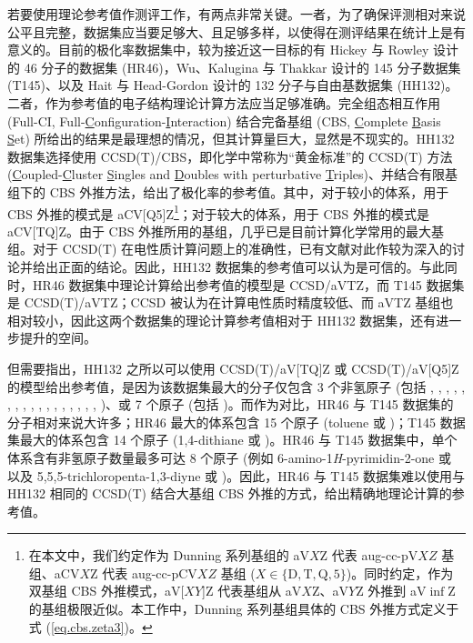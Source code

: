 若要使用理论参考值作测评工作，有两点非常关键。一者，为了确保评测相对来说公平且完整，数据集应当要足够大、且足够多样，以使得在测评结果在统计上是有意义的。目前的极化率数据集中，较为接近这一目标的有 Hickey 与 Rowley 设计的 46 分子的数据集 (HR46)\cite{Hickey-Rowley.JPCA.2014}，Wu、Kalugina 与 Thakkar 设计的 145 分子数据集 (T145)\cite{Wu-Thakkar.CPL.2015}、以及 Hait 与 Head-Gordon 设计的 132 分子与自由基数据集 (HH132)\cite{Hait-Head-Gordon.PCCP.2018}。二者，作为参考值的电子结构理论计算方法应当足够准确。完全组态相互作用 (Full-CI, Full-\underline{C}onfiguration-\underline{I}nteraction) 结合完备基组 (CBS, \underline{C}omplete \underline{B}asis \underline{S}et) 所给出的结果是最理想的情况，但其计算量巨大，显然是不现实的。HH132 数据集选择使用 CCSD(T)/CBS，即化学中常称为“黄金标准”的 CCSD(T) 方法 (\underline{C}oupled-\underline{C}luster \underline{S}ingles and \underline{D}oubles with perturbative \underline{T}riples)\cite{Cizek-Cizek.Wiley.1969, Raghavachari-Head-Gordon.CPL.1989}、并结合有限基组下的 CBS 外推方法\cite{Nyden-Petersson.JCP.1981, Petersson-Mantzaris.JCP.1988}，给出了极化率的参考值。其中，对于较小的体系，用于 CBS 外推的模式是 aCV[Q5]Z\footnote{在本文中，我们约定作为 Dunning 系列基组的 aV$X$Z 代表 aug-cc-pV$XZ$ 基组、aCV$X$Z 代表 aug-cc-pCV$XZ$ 基组 ($X \in \{\mathrm{D, T, Q, 5}\}$)。同时约定，作为双基组 CBS 外推模式，aV[$XY$]Z 代表基组从 aV$X$Z、aV$Y$Z 外推到 aV$\inf$Z 的基组极限近似。本工作中，Dunning 系列基组具体的 CBS 外推方式定义于式 (\ref{eq.cbs.zeta3})。}；对于较大的体系，用于 CBS 外推的模式是 aCV[TQ]Z\cite{Hait-Head-Gordon.PCCP.2018, Hait-Head-Gordon.JCTC.2018}。由于 CBS 外推所用的基组，几乎已是目前计算化学常用的最大基组。对于 CCSD(T) 在电性质计算问题上的准确性，已有文献对此作较为深入的讨论并给出正面的结论\cite{Halkier-Joergensen.JCP.1999, Monten-Deleuze.MP.2011, Hait-Head-Gordon.JCTC.2018}。因此，HH132 数据集的参考值可以认为是可信的。与此同时，HR46 数据集中理论计算给出参考值的模型是 CCSD/aVTZ，而 T145 数据集是 CCSD(T)/aVTZ；CCSD 被认为在计算电性质时精度较低、而 aVTZ 基组也相对较小，因此这两个数据集的理论计算参考值相对于 HH132 数据集，还有进一步提升的空间。

但需要指出，HH132 之所以可以使用 CCSD(T)/aV[TQ]Z 或 CCSD(T)/aV[Q5]Z 的模型给出参考值，是因为该数据集最大的分子仅包含 3 个非氢原子 (包括 , , , , , , , , , , , , , , , , , )、或 7 个原子 (包括 )。而作为对比，HR46 与 T145 数据集的分子相对来说大许多；HR46 最大的体系包含 15 个原子 (toluene 或 )；T145 数据集最大的体系包含 14 个原子 (1,4-dithiane 或 )。HR46 与 T145 数据集中，单个体系含有非氢原子数量最多可达 8 个原子 (例如 6-amino-1\textit{H}-pyrimidin-2-one 或  以及 5,5,5-trichloropenta-1,3-diyne 或 )。因此，HR46 与 T145 数据集难以使用与 HH132 相同的 CCSD(T) 结合大基组 CBS 外推的方式，给出精确地理论计算的参考值。


